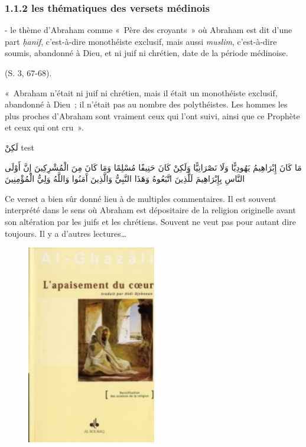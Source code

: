 
\subsubsection{1.1.2 les thématiques des versets
médinois
}

- le thème d'Abraham comme «~Père des croyants~» où Abraham est dit
d'une part \emph{ḥanīf}, c'est-à-dire monothéiste exclusif, mais aussi
\emph{muslim}, c'est-à-dire soumis, abandonné à Dieu, et ni juif ni
chrétien, date de la période médinoise.

(S. 3, 67-68).

«~Abraham n'était ni juif ni chrétien, mais il était un monothéiste
exclusif, abandonné à Dieu~; il n'était pas au nombre des polythéistes.
Les hommes les plus proches d'Abraham sont vraiment ceux qui l'ont
suivi, ainsi que ce Prophète et ceux qui ont cru~».


\foreignlanguage{arabic}{لَكِنْ
}
test




\begin{otherlanguage}{arabic}
{مَا كَانَ إِبْرَاهِيمُ يَهُودِيًّا وَلَا نَصْرَانِيًّا وَلَكِنْ
كَانَ حَنِيفًا مُسْلِمًا وَمَا كَانَ مِنَ الْمُشْرِكِينَ إِنَّ أَوْلَى
النَّاسِ بِإِبْرَاهِيمَ لَلَّذِينَ اتَّبَعُوهُ وَهَذَا النَّبِيُّ
وَالَّذِينَ آَمَنُوا وَاللَّهُ وَلِيُّ الْمُؤْمِنِينَ}
\end{otherlanguage}

Ce verset a bien sûr donné lieu à de multiples commentaires. Il est
souvent interprété dans le sens où Abraham est dépositaire de la
religion originelle avant son altération par les juifs et les chrétiens. \cite{Ben62}
Souvent ne veut pas pour autant dire toujours. Il y a d'autres
lectures\ldots{} 

\begin{figure}
\includegraphics{Images/image002.jpg}
\end{figure}


